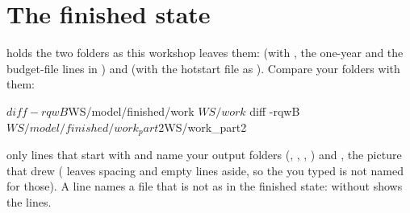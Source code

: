 \section{The finished state}
 holds the two folders as this workshop leaves them:  (with , the
one-year  and the budget-file lines in ) and  (with the hotstart file as
). Compare your folders with them:
\begin{shell}
$ diff -rqwB $WS/model/finished/work $WS/work
$ diff -rqwB $WS/model/finished/work_part2 $WS/work_part2
\end{shell}
\see only lines that start with  and name your output folders (, , ,
) and , the picture that
 drew ( leaves spacing and empty lines aside, so the  you typed
is not named for those). A line  names a file that is not as in the finished state:
 without  shows the lines.
